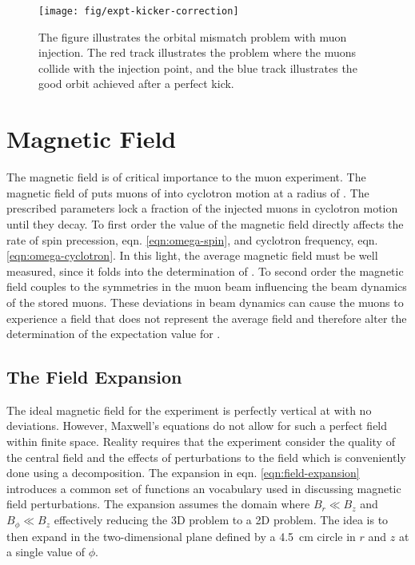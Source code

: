 \begin{figure}
\centering
\texttt{[image: fig/expt-kicker-correction]}
\caption{The figure illustrates the orbital mismatch problem with muon injection.  The red track illustrates the problem where the muons collide with the injection point, and the blue track illustrates the good orbit achieved after a perfect kick. \label{fig:expt-kicker-correction}}
\end{figure}

\section{Magnetic Field} \label{sec:magnetic-field}

The magnetic field is of critical importance to the muon \gmtwo experiment.  The magnetic field of \bmagic puts muons of \pmagic into cyclotron motion at a radius of \rmagic.  The prescribed parameters lock a fraction of the injected muons in cyclotron motion until they decay.  To first order the value of the magnetic field directly affects the rate of spin precession, eqn. \ref{eqn:omega-spin}, and cyclotron frequency, eqn. \ref{eqn:omega-cyclotron}.  In this light, the average magnetic field must be well measured, since it folds into the determination of \wa.  To second order the magnetic field couples to the symmetries in the muon beam influencing the beam dynamics of the stored muons.  These deviations in beam dynamics can cause the muons to experience a field that does not represent the average field and therefore alter the determination of the expectation value for \wa.

\subsection{The Field Expansion}

The ideal magnetic field for the experiment is perfectly vertical at \bmagic with no deviations.  However, Maxwell's equations do not allow for such a perfect field within finite space.  Reality requires that the experiment consider the quality of the central field and the effects of perturbations to the field which is conveniently done using a decomposition.  The expansion in eqn. \ref{eqn:field-expansion} introduces a common set of functions an vocabulary used in discussing magnetic field perturbations.  The expansion assumes the domain where $B_r \ll B_z$ and $B_\phi \ll B_z$ effectively reducing the 3D problem to a 2D problem.  The idea is to then expand in the two-dimensional plane defined by a \SI{4.5}{\cm} circle in $r$ and $z$ at a single value of $\phi$.


